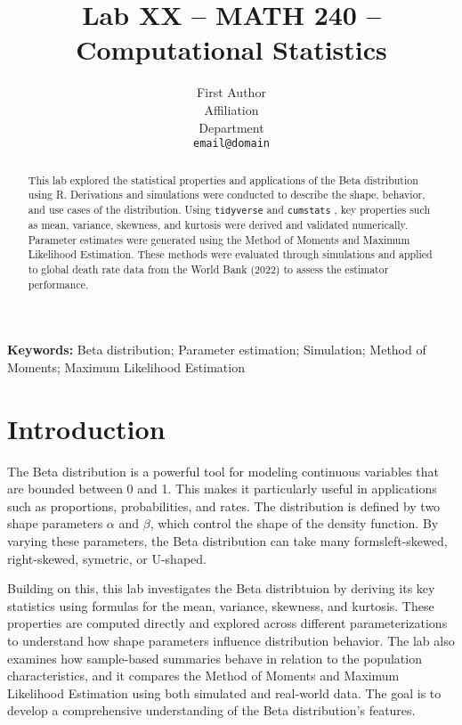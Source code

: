 \documentclass{article}\usepackage[]{graphicx}\usepackage[]{xcolor}
\begin{document}
\vspace{-1in}
\title{Lab XX -- MATH 240 -- Computational Statistics}

\author{
  First Author \\
  Affiliation  \\
  Department  \\
  {\tt email@domain}
}

\date{}

\maketitle

\begin{multicols}{2}
\begin{abstract}
This lab explored the statistical properties and applications of the Beta distribution using R. Derivations and simulations were conducted to describe the shape, behavior, and use cases of the distribution. Using \texttt{tidyverse} \citep{tidyverse} and \texttt{cumstats} \citep{cumstat}, key properties such as mean, variance, skewness, and kurtosis were derived and validated numerically. Parameter estimates were generated using the Method of Moments and Maximum Likelihood Estimation. These methods were evaluated through simulations and applied to global death rate data from the World Bank (2022) to assess the estimator performance.
\end{abstract}

\noindent \textbf{Keywords:} Beta distribution; Parameter estimation; Simulation; Method of Moments; Maximum Likelihood Estimation

\section{Introduction}

\indent The Beta distribution is a powerful tool for modeling continuous variables that are bounded between 0 and 1. This makes it particularly useful in applications such as proportions, probabilities, and rates. The distribution is defined by two shape parameters $\alpha$ and $\beta$, which control the shape of the density function. By varying these parameters, the Beta distribution can take many forms\textemdash left-skewed, right-skewed, symetric, or U-shaped.

Building on this, this lab investigates the Beta distribtuion by deriving its key statistics using formulas for the mean, variance, skewness, and kurtosis. These properties are computed directly and explored across different parameterizations to understand how shape parameters influence distribution behavior. The lab also examines how sample-based summaries behave in relation to the population characteristics, and it compares the Method of Moments and Maximum Likelihood Estimation using both simulated and real-world data. The goal is to develop a comprehensive understanding of the Beta distribution's features.


\end{multicols}
\end{document}
